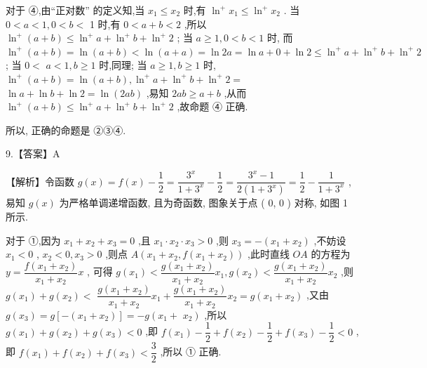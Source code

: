 \documentclass[10pt]{article}
\begin{document}
对于 ④,由“正对数” 的定义知,当 ${x}_{1} \leq  {x}_{2}$ 时,有 ${\ln }^{ + }{x}_{1} \leq  {\ln }^{ + }{x}_{2}$ . 当 $0 < a < 1,0 < b <$ 1 时,有 $0 < a + b < 2$ ,所以 ${\ln }^{ + }\left( {a + b}\right)  \leq  {\ln }^{ + }a + {\ln }^{ + }b + {\ln }^{ + }2$ ; 当 $a \geq  1,0 < b < 1$ 时, 而 ${\ln }^{ + }\left( {a + b}\right)  = \ln \left( {a + b}\right)  < \ln \left( {a + a}\right)  = \ln {2a} = \ln a + 0 + \ln 2 \leq  {\ln }^{ + }a + {\ln }^{ + }b + {\ln }^{ + }2$ ; 当 $0 <$  $a < 1,b \geq  1$ 时,同理; 当 $a \geq  1,b \geq  1$ 时, ${\ln }^{ + }\left( {a + b}\right)  = \ln \left( {a + b}\right) ,{\ln }^{ + }a + {\ln }^{ + }b + {\ln }^{ + }2 =$  $\ln a + \ln b + \ln 2 = \ln \left( {2ab}\right)$ ,易知 ${2ab} \geq  a + b$ ,从而 ${\ln }^{ + }\left( {a + b}\right)  \leq  {\ln }^{ + }a + {\ln }^{ + }b + {\ln }^{ + }2$ ,故命题 ④ 正确.

所以, 正确的命题是 ②③④.

9.【答案】A

【解析】令函数 $g\left( x\right)  = f\left( x\right)  - \dfrac{1}{2} = \dfrac{{3}^{x}}{1 + {3}^{x}} - \dfrac{1}{2} = \dfrac{{3}^{x} - 1}{2\left( {1 + {3}^{x}}\right) } = \dfrac{1}{2} - \dfrac{1}{1 + {3}^{x}}$ ,易知 $g\left( x\right)$ 为严格单调递增函数, 且为奇函数, 图象关于点 ( 0, 0 ) 对称, 如图 1 所示.

对于 ①,因为 ${x}_{1} + {x}_{2} + {x}_{3} = 0$ ,且 ${x}_{1} \cdot  {x}_{2} \cdot  {x}_{3} > 0$ ,则 ${x}_{3} =  - \left( {{x}_{1} + {x}_{2}}\right)$ ,不妨设 ${x}_{1} < 0$ , ${x}_{2} < 0,{x}_{3} > 0$ ,则点 $A\left( {{x}_{1} + {x}_{2},f\left( {{x}_{1} + {x}_{2}}\right) }\right)$ ,此时直线 ${OA}$ 的方程为 $y = \dfrac{f\left( {{x}_{1} + {x}_{2}}\right) }{{x}_{1} + {x}_{2}}x$ , 可得 $g\left( {x}_{1}\right)  < \dfrac{g\left( {{x}_{1} + {x}_{2}}\right) }{{x}_{1} + {x}_{2}}{x}_{1},g\left( {x}_{2}\right)  < \dfrac{g\left( {{x}_{1} + {x}_{2}}\right) }{{x}_{1} + {x}_{2}}{x}_{2}$ ,则 $g\left( {x}_{1}\right)  + g\left( {x}_{2}\right)  <$  $\dfrac{g\left( {{x}_{1} + {x}_{2}}\right) }{{x}_{1} + {x}_{2}}{x}_{1} + \dfrac{g\left( {{x}_{1} + {x}_{2}}\right) }{{x}_{1} + {x}_{2}}{x}_{2} = g\left( {{x}_{1} + {x}_{2}}\right)$ ,又由 $g\left( {x}_{3}\right)  = g\left\lbrack  {-\left( {{x}_{1} + {x}_{2}}\right) }\right\rbrack   =  - g\left( {{x}_{1} + }\right.$  $\left. {x}_{2}\right)$ ,所以 $g\left( {x}_{1}\right)  + g\left( {x}_{2}\right)  + g\left( {x}_{3}\right)  < 0$ ,即 $f\left( {x}_{1}\right)  - \dfrac{1}{2} + f\left( {x}_{2}\right)  - \dfrac{1}{2} + f\left( {x}_{3}\right)  - \dfrac{1}{2} < 0$ ,即 $f\left( {x}_{1}\right)  + f\left( {x}_{2}\right)  + f\left( {x}_{3}\right)  < \dfrac{3}{2}$ ,所以 ① 正确.
\end{document}
